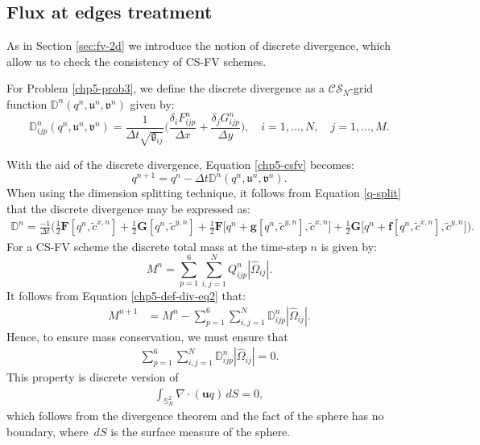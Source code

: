 \subsection{Flux at edges treatment}
\label{flux-av}
As in Section \ref{sec:fv-2d}  we introduce the notion of discrete divergence,
which allow us to check the consistency of CS-FV schemes.
\begin{definition}
	\label{chp5-def-div}
	For Problem \ref{chp5-prob3}, we define the discrete divergence as a 
	$\mathcal{CS}_N$-grid function $\mathbb{D}^n(q^n,\mathfrak{u}^n,\mathfrak{v}^n)$
	given by:
	\begin{equation}
		\label{chp5-def-div-eq}
		\mathbb{D}_{ijp}^n(q^n,\mathfrak{u}^n,\mathfrak{v}^n)=  \frac{1}{\Delta t \sqrt{\mathfrak{g}_{ij}}}
		\bigg(\frac{\delta_i {F}_{ijp}^{n}}{\Delta x} + \frac{\delta_j {G}_{ijp}^{n}}{\Delta y}\bigg), 
		\quad i = 1, \ldots, N, \quad j=1, \ldots,M.
	\end{equation}
\end{definition}
With the aid of the discrete divergence, Equation \eqref{chp5-csfv} becomes:
\begin{equation}
	\label{chp5-def-div-eq2}
	q^{n+1} = q^n - \Delta t \mathbb{D}^n(q^n,\mathfrak{u}^n,\mathfrak{v}^n).
\end{equation}
When using the dimension splitting technique, it follows from Equation \eqref{q-split} that 
the discrete divergence may be expressed as:
\begin{align}
	\label{eqdiv-split}
	\mathbb{D}^n = \frac{-1}{\Delta t}\bigg(
 \frac{1}{2}\mathbf{F}[q^n,\tilde{c}^{x,n}] +\frac{1}{2}\mathbf{G}[q^n,\tilde{c}^{y,n}]
+\frac{1}{2}\mathbf{F}\bigg[q^n + \mathbf{g}[q^n, \tilde{c}^{y,n}], \tilde{c}^{x,n}\bigg]
+\frac{1}{2}\mathbf{G}\bigg[q^n + \mathbf{f}[q^n, \tilde{c}^{x,n}], \tilde{c}^{y,n}\bigg]\bigg).
\end{align}
For a CS-FV scheme the discrete total mass at the time-step $n$ is given by:
\begin{equation*}
	M^n =\sum_{p=1}^6 \sum_{i,j=1}^N Q_{ijp}^n |\hat{\Omega}_{ij}|.
\end{equation*}
It follows from Equation \eqref{chp5-def-div-eq2} that:
\begin{align*}
	M^{n+1} &= M^n  - \sum_{p=1}^6 \sum_{i,j=1}^N \mathbb{D}_{ijp}^{n} |\hat{\Omega}_{ij}|.
\end{align*}
Hence, to ensure mass conservation, we must ensure that
\begin{align*}
	\sum_{p=1}^6 \sum_{i,j=1}^N   \mathbb{D}_{ijp}^{n} |\hat{\Omega}_{ij}| = 0.
\end{align*}
This property is discrete version of
\begin{align*}
	\int_{\mathbb{S}^2_R} \nabla \cdot (\boldsymbol{u}q) \,dS = 0,
\end{align*}
which follows from the divergence theorem and the fact of the sphere has no boundary, where $\,dS$ is the surface measure of the sphere.

